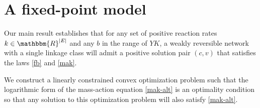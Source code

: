 \documentclass[smallextended]{svjour3}       %
\newcommand*{\0}{\mathbf{0}}
\newcommand*{\1}{\mathbf{1}}
\newcommand*{\R}{\mathbbm{R}}
\begin{document}
\section{A fixed-point model} 
\label{section:fp-model}

Our main result establishes that for any set of positive reaction rates
$k\in\R^{|E|}$ and any $b$ in the range of $YK$, a weakly reversible network with 
a single linkage class will admit a positive solution pair $(c,v)$ that satisfies the laws
\eqref{fb} and \eqref{mak}.  

We construct a linearly constrained convex optimization
problem such that the logarithmic form of the mass-action equation
\eqref{mak-alt} is an optimality condition so that any solution to this
optimization problem will also satisfy \eqref{mak-alt}.
\end{document}

